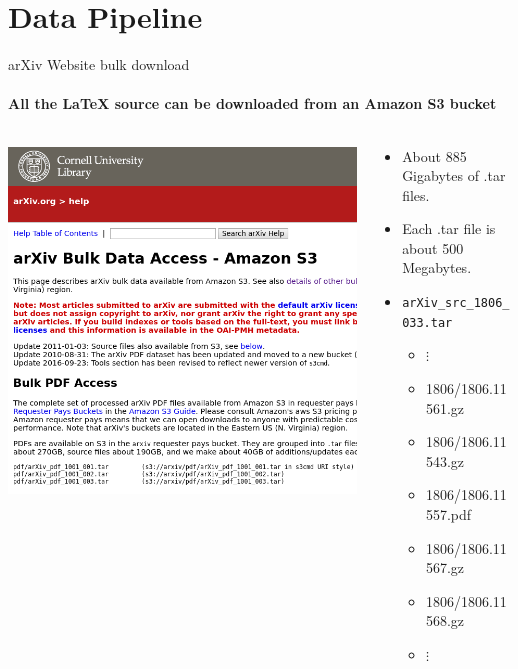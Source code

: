 \documentclass{beamer}
\begin{document}
\section{Data Pipeline}
\begin{frame}{arXiv Website bulk download}
    \framesubtitle{All the \LaTeX{} source can be downloaded from an Amazon S3 bucket}
    \begin{columns}[T]
        \begin{column}{0.4\textwidth}
    \includegraphics[width=\textwidth]{bulk_download.png} 
        \end{column}
        \begin{column}{0.6\textwidth}
            \begin{itemize}
                \item About 885 Gigabytes of .tar files.
                \item Each .tar file is about 500 Megabytes.
                \item \texttt{arXiv\_src\_1806\_033.tar}
                    \begin{itemize}
\item \hspace{4em}      $\vdots$
\item 1806/1806.11561.gz
\item 1806/1806.11543.gz
\item 1806/1806.11557.pdf
\item 1806/1806.11567.gz
\item 1806/1806.11568.gz
\item \hspace{4em}      $\vdots$
\end{itemize}


            \end{itemize}
        \end{column}
    \end{columns}
\end{frame}
\end{document}
